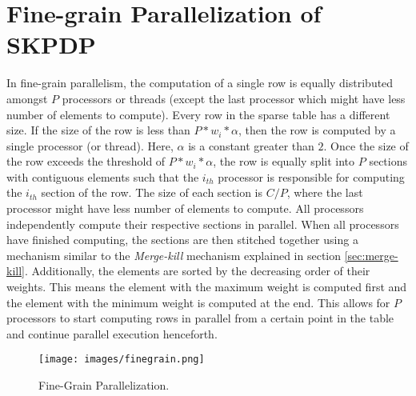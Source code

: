 \chapter{Fine-grain Parallelization of SKPDP}
\label{chap:finegrain}



In fine-grain parallelism, the computation of a single row is equally distributed amongst $P$ processors or threads (except the last processor which might have less number of elements to compute).  Every row in the sparse table has a different size.  If the size of the row is less than $P*w_{i}*\alpha$, then the row is computed by a single processor (or thread).  Here,  $\alpha$ is a constant greater than $2$.  Once the size of the row exceeds the threshold of $P*w_{i}*\alpha$, the row is equally split into $P$ sections with contiguous elements such that the $i_{th}$ processor is responsible for computing the $i_{th}$ section of the row.  The size of each section is $C/P$, where the last processor might have less number of elements to compute.  All processors independently compute their respective sections in parallel.  When all processors have finished computing, the sections are then stitched together using a mechanism similar to the \emph{Merge-kill} mechanism explained in section \ref{sec:merge-kill}.  
Additionally, the elements are sorted by the decreasing order of their weights.  This means the element with the maximum weight is computed first and the element with the minimum weight is computed at the end.  This allows for $P$ processors to start computing rows in parallel from a certain point in the table and continue parallel execution henceforth.  


\begin{figure}[htbp]
\centerline{\texttt{[image: images/finegrain.png]}}
\caption{Fine-Grain Parallelization. }
\label{fig:finegrain}
\end{figure}


